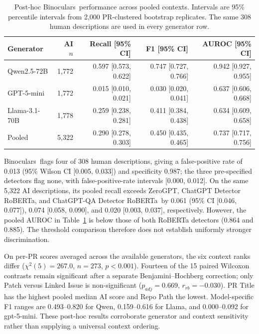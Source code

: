 \documentclass[11pt,a4paper]{article}
\newcommand{\zeroGptDetector}{ZeroGPT}
\newcommand{\robertaDetector}{ChatGPT Detector RoBERTa}
\newcommand{\robertaQaDetector}{ChatGPT-QA Detector RoBERTa}
\newcommand{\binocularsDetector}{Binoculars}
\begin{document}
\begin{table}[htbp]
\centering
\caption{Post-hoc \binocularsDetector~performance across pooled contexts. Intervals are 95\%
percentile intervals from 2,000 PR-clustered bootstrap replicates. The same 308 human
descriptions are used in every generator row.}
\label{tab:binoculars_pooled}
\small
\setlength{\tabcolsep}{4pt}
\begin{tabular}{lrrrr}
\toprule
\textbf{Generator} & \textbf{AI $n$} & \textbf{Recall [95\% CI]} & \textbf{F1 [95\% CI]} & \textbf{AUROC [95\% CI]} \\ \midrule
Qwen2.5-72B & 1,772 & 0.597 [0.573, 0.622] & 0.747 [0.727, 0.766] & 0.942 [0.927, 0.955] \\
GPT-5-mini & 1,772 & 0.015 [0.010, 0.021] & 0.030 [0.020, 0.041] & 0.637 [0.606, 0.668] \\
Llama-3.1-70B & 1,778 & 0.259 [0.238, 0.281] & 0.411 [0.384, 0.438] & 0.634 [0.609, 0.658] \\ \midrule
Pooled & 5,322 & 0.290 [0.278, 0.303] & 0.450 [0.435, 0.465] & 0.737 [0.717, 0.756] \\ \bottomrule
\end{tabular}
\end{table}

\binocularsDetector~flags four of 308 human descriptions, giving a false-positive rate of
0.013 (95\% Wilson CI [0.005, 0.033]) and specificity 0.987; the three pre-specified
detectors flag none, with false-positive-rate intervals [0.000, 0.012]. On the same 5,322 AI descriptions,
its pooled recall exceeds \zeroGptDetector, \robertaDetector, and \robertaQaDetector~by 0.061
(95\% CI [0.046, 0.077]), 0.074 [0.058, 0.090], and 0.020 [0.003, 0.037], respectively.
However, the pooled AUROC in Table~\ref{tab:binoculars_pooled} is below those of both RoBERTa
detectors (0.864 and 0.885). The threshold comparison therefore does not establish uniformly
stronger discrimination.

On per-PR scores averaged across the available generators, the six context ranks differ
($\chi^2(5)=267.0$, $n=273$, $p<0.001$). Fourteen of the 15 paired Wilcoxon contrasts remain
significant after a separate Benjamini--Hochberg correction; only Patch versus Linked Issue
is non-significant ($p_{adj}=0.669$, $r_{rb}=-0.030$). PR Title has the highest pooled median AI
score and Repo Path the lowest. Model-specific F1 ranges are 0.493--0.820 for Qwen,
0.159--0.616 for Llama, and 0.000--0.092 for gpt-5-mini. These post-hoc results corroborate
generator and context sensitivity rather than supplying a universal context ordering.
\end{document}
